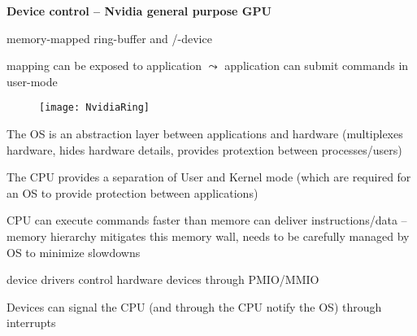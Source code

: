 \textbf{Device control -- Nvidia general purpose GPU}
\begin{items}
	\item memory-mapped ring-buffer and /-device
	\item mapping can be exposed to application \( \leadsto \) application can submit commands in user-mode
	\begin{figure}[H]\centering\label{NvidiaRing}\texttt{[image: NvidiaRing]}\end{figure}
\end{items}

\begin{summary}
	\begin{items}
		\item The OS is an abstraction layer between applications and hardware (multiplexes hardware, hides hardware details, provides protextion between processes/users)
		\item The CPU provides a separation of User and Kernel mode (which are required for an OS to provide protection between applications)
		\item CPU can execute commands faster than memore can deliver instructions/data -- memory hierarchy mitigates this memory wall, needs to be carefully managed by OS to minimize slowdowns
		\item device drivers control hardware devices through PMIO/MMIO
		\item Devices can signal the CPU (and through the CPU notify the OS) through interrupts
	\end{items}
\end{summary}